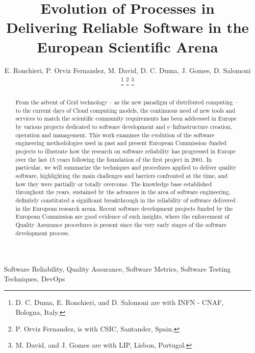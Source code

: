 \documentclass[journal]{IEEEtran}
\begin{document}
\title{Evolution of Processes in Delivering Reliable Software in the European Scientific Arena}

\author{E. Ronchieri,
        P. Orviz Fernandez,
        M. David,
        D. C. Duma,
        J. Gomes,
        D. Salomoni
\thanks{D. C. Duma, E. Ronchieri, and D. Salomoni are with INFN - CNAF, Bologna, Italy.}
\thanks{P. Orviz Fernandez, is with CSIC, Santander, Spain.}
\thanks{M. David, and J. Gomes are with LIP, Lisbon, Portugal.}%
}

\maketitle

\begin{abstract}

From the advent of Grid technology -- as the new paradigm of distributed
computing -- to the current days of Cloud computing models, the continuous need
of new tools and services to match the scientific community requirements has been
addressed in Europe by various projects dedicated to software development
and e--Infrastructure creation, operation and management.
This work examines the evolution of the software engineering methodologies used in past and
present European Commission--funded projects to illustrate how the research on software
reliability has progressed in Europe over the last 15 years following the foundation of the
first project in 2001. In particular, we will summarize the techniques and procedures
applied to deliver quality software, highlighting the main challenges and barriers confronted
at the time, and how they were partially or totally overcome. The knowledge base established
throughout the years, sustained by the advances in the area of software engineering,
definitely constituted a significant breakthrough in the reliability of software delivered in the
European research arena. Recent software development projects funded by the European
Commission are good evidence of such insights, where the enforcement of Quality Assurance
procedures is present since the very early stages of the software development process.

\end{abstract}

\begin{IEEEkeywords}
Software Reliability, Quality Assurance, Software Metrics, Software Testing
Techniques, DevOps
\end{IEEEkeywords}

\IEEEpeerreviewmaketitle
\end{document}
